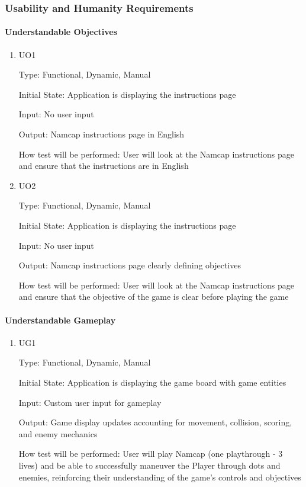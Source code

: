 \documentclass[12pt, titlepage]{article}
\begin{document}
\subsubsection{Usability and Humanity Requirements}

\paragraph{Understandable Objectives}

\begin{enumerate}

\item{UO1\\}

Type: Functional, Dynamic, Manual
					
Initial State: Application is displaying the instructions page
					
Input: No user input
					
Output: Namcap instructions page in English
					
How test will be performed: User will look at the Namcap instructions page and ensure that the instructions are in English
					
\item{UO2\\}

Type: Functional, Dynamic, Manual
					
Initial State: Application is displaying the instructions page
					
Input: No user input
					
Output: Namcap instructions page clearly defining objectives
					
How test will be performed: User will look at the Namcap instructions page and ensure that the objective of the game is clear before playing the game

\end{enumerate}

\paragraph{Understandable Gameplay}

\begin{enumerate}

\item{UG1\\}

Type: Functional, Dynamic, Manual
					
Initial State: Application is displaying the game board with game entities
					
Input: Custom user input for gameplay
					
Output: Game display updates accounting for movement, collision, scoring, and enemy mechanics
					
How test will be performed: User will play Namcap (one playthrough - 3 lives) and be able to successfully maneuver the Player through dots and enemies, reinforcing their understanding of the game's controls and objectives

\end{enumerate}
\end{document}
